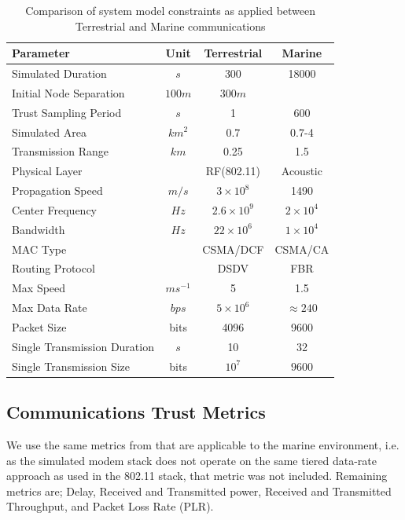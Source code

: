 %
\begin{table}[h]
	\caption{Comparison of system model constraints as applied between Terrestrial and Marine communications} \label{tab:sysconstraints}
	\begin{center}
		\setlength{\tabcolsep}{8pt}
		\begin{tabular}{lccc}
			\toprule
			Parameter & Unit & Terrestrial & Marine \\
			\midrule
			Simulated Duration & $s$ & 300 & 18000\\
			Initial Node Separation & $100m$ & $300m$\\
			Trust Sampling Period & $s$ & 1 & 600 \\
			Simulated Area & $km^2$ & 0.7 & 0.7-4 \\
			Transmission Range & $km$ & 0.25 & 1.5 \\
			Physical Layer & & RF(802.11) & Acoustic\\
			Propagation Speed& $m/s$ & $3\times10^8$ & 1490\\
			Center Frequency& $Hz$ & $2.6\times10^9$ & $2 \times 10^4$ \\
			Bandwidth& $Hz$ & $22\times10^6$ & $1\times10^4$\\
			MAC Type & & CSMA/DCF & CSMA/CA\\
			Routing Protocol & & DSDV & FBR \\
			Max Speed & $ms^{-1}$ & 5 & 1.5 \\
			Max Data Rate & $bps$ & $5\times10^6$ & $\approx 240$ \\
			Packet Size & bits & 4096 &  9600 \\
			Single Transmission Duration & $s$ & 10 & 32 \\
			Single Transmission Size & bits & $10^7$ & $9600$ \\
			\bottomrule
		\end{tabular}
		\setlength{\tabcolsep}{6pt}
	\end{center}
\end{table}
%

\subsection{Communications Trust Metrics}

We use the same metrics from \cite{Guo2012} that are applicable to the marine environment, i.e. as the simulated modem stack does not operate on the same tiered data-rate approach as used in the 802.11 stack, that metric was not included. Remaining metrics are; Delay, Received and Transmitted power, Received and Transmitted Throughput, and Packet Loss Rate (PLR).

